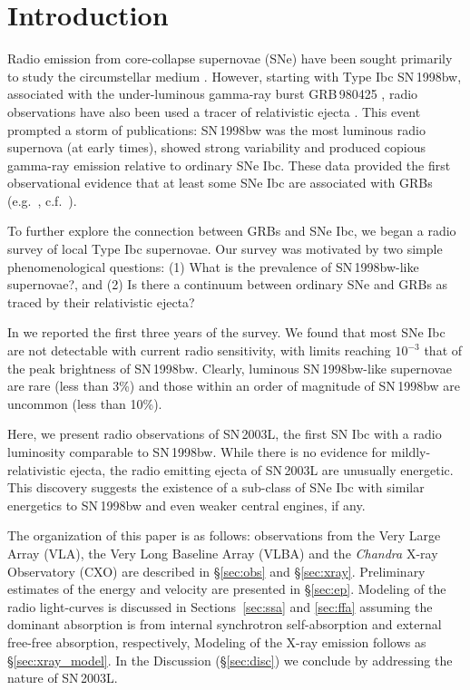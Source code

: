 \documentclass[12pt,preprint]{aastex}
\begin{document}

\section{Introduction}
Radio emission from core-collapse supernovae (SNe) have been sought
primarily to study the circumstellar medium
\citep{wsp+86,c98}. However, starting with Type Ibc SN\,1998bw,
associated with the under-luminous gamma-ray burst GRB\,980425
\citep{paa+00,gvv+98,kfw+98}, radio observations have also been
used a tracer of relativistic ejecta \citep{kfw+98,lc99}.  This event
prompted a storm of publications: SN\,1998bw was the most luminous
radio supernova (at early times), showed strong variability and
produced copious gamma-ray emission relative to ordinary SNe Ibc.
These data provided the first observational evidence that at least
some SNe Ibc are associated with GRBs
(e.g.~\citealt{bkd+99,bkp+02,smg+03}, c.f.~\citealt{pks+03}).  

To further explore the connection between GRBs and SNe Ibc, we 
began a radio survey of local Type Ibc supernovae. Our survey was motivated
by two simple phenomenological questions: (1) What is the prevalence of
SN\,1998bw-like supernovae?, and (2) Is there a continuum between ordinary 
SNe and GRBs as traced by their relativistic ejecta?

In \citet{bkf+03} we reported the first three years of the survey.  We
found that most SNe Ibc are not detectable with current radio
sensitivity, with limits reaching $10^{-3}$ that of the peak
brightness of SN\,1998bw.  Clearly, luminous SN\,1998bw-like supernovae
are rare (less than 3\%) and those within an order of magnitude
of SN\,1998bw are uncommon (less than 10\%).

Here, we present radio observations of SN\,2003L, the first SN Ibc
with a radio luminosity comparable to SN\,1998bw.  While there is no
evidence for mildly-relativistic ejecta, the radio emitting ejecta of
SN\,2003L are unusually energetic.  This discovery suggests the
existence of a sub-class of SNe Ibc with similar energetics to
SN\,1998bw and even weaker central engines, if any.

The organization of this paper is as follows: observations from the
Very Large Array (VLA), the Very Long Baseline Array (VLBA) and the
{\it Chandra} X-ray Observatory (CXO) are described in \S\ref{sec:obs}
and \S\ref{sec:xray}.  Preliminary estimates of the energy and
velocity are presented in \S\ref{sec:ep}.  Modeling of the radio
light-curves is discussed in Sections~\ref{sec:ssa} and \ref{sec:ffa}
assuming the dominant absorption is from internal
synchrotron self-absorption and external free-free absorption, respectively,
Modeling of the X-ray emission follows as \S\ref{sec:xray_model}.
In the Discussion (\S\ref{sec:disc}) we conclude by addressing the
nature of SN\,2003L.
\end{document}
